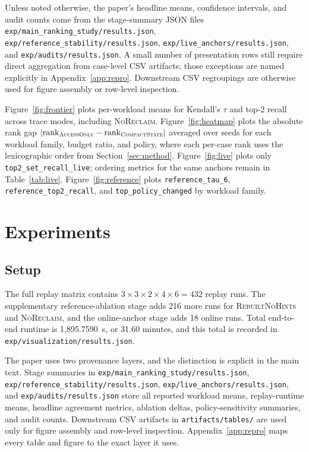\documentclass{article}
\newcommand{\tracecompact}{\textsc{CompactState}}
\newcommand{\traceaccess}{\textsc{AccessOnly}}
\newcommand{\tracenoreclaim}{\textsc{NoReclaim}}
\newcommand{\rebuilt}{\textsc{RebuiltNoHints}}
\begin{document}
Unless noted otherwise, the paper's headline means, confidence intervals, and audit counts come from the stage-summary JSON files \texttt{exp/main\_ranking\_study/results.json}, \texttt{exp/reference\_stability/results.json}, \texttt{exp/live\_anchors/results.json}, and \texttt{exp/audits/results.json}. A small number of presentation rows still require direct aggregation from case-level CSV artifacts; those exceptions are named explicitly in Appendix~\ref{app:repro}. Downstream CSV regroupings are otherwise used for figure assembly or row-level inspection.

Figure~\ref{fig:frontier} plots per-workload means for Kendall's $\tau$ and top-2 recall across trace modes, including \tracenoreclaim{}. Figure~\ref{fig:heatmap} plots the absolute rank gap $|\mathrm{rank}_{\traceaccess{}}-\mathrm{rank}_{\tracecompact{}}|$ averaged over seeds for each workload family, budget ratio, and policy, where each per-case rank uses the lexicographic order from Section~\ref{sec:method}. Figure~\ref{fig:live} plots only \texttt{top2\_set\_recall\_live}; ordering metrics for the same anchors remain in Table~\ref{tab:live}. Figure~\ref{fig:reference} plots \texttt{reference\_tau\_6}, \texttt{reference\_top2\_recall}, and \texttt{top\_policy\_changed} by workload family.

\section{Experiments}
\label{sec:experiments}
\subsection{Setup}
The full replay matrix contains $3 \times 3 \times 2 \times 4 \times 6 = 432$ replay runs. The supplementary reference-ablation stage adds 216 more runs for \rebuilt{} and \tracenoreclaim{}, and the online-anchor stage adds 18 online runs. Total end-to-end runtime is 1{,}895.7590~s, or 31.60 minutes, and this total is recorded in \texttt{exp/visualization/results.json}.

The paper uses two provenance layers, and the distinction is explicit in the main text. Stage summaries in \texttt{exp/main\_ranking\_study/results.json}, \texttt{exp/reference\_stability/results.json}, \texttt{exp/live\_anchors/results.json}, and \texttt{exp/audits/results.json} store all reported workload means, replay-runtime means, headline agreement metrics, ablation deltas, policy-sensitivity summaries, and audit counts. Downstream CSV artifacts in \texttt{artifacts/tables/} are used only for figure assembly and row-level inspection. Appendix~\ref{app:repro} maps every table and figure to the exact layer it uses.
\end{document}
